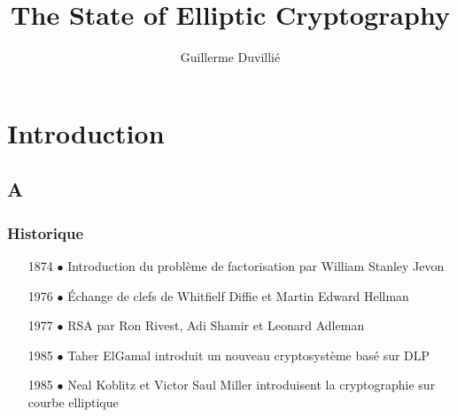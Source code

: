 \documentclass[9pt]{beamer}
\title[Elliptic Curve Cryptography]{The State of Elliptic Cryptography}
\author[G. Duvillié]{Guillerme Duvillié}
\institute{Université Montpellier 2}
\begin{document}
\begin{frame}
    \titlepage
\end{frame}

\addtocounter{framenumber}{-1}

\section{Introduction}

\subsection*{A}

\begin{frame}
    \frametitle{Historique}
    \vfill
    \begin{itemize}
        \item[1874 $\bullet$] Introduction du problème de factorisation par William Stanley
            Jevon
            \vfill
        \item[1976 $\bullet$] Échange de clefs de Whitfielf Diffie et Martin Edward Hellman
            \vfill
        \item[1977 $\bullet$] RSA par Ron Rivest, Adi Shamir et Leonard Adleman
            \vfill
        \item[1985 $\bullet$] Taher ElGamal introduit un nouveau cryptosystème basé sur DLP
            \vfill
        \item[1985 $\bullet$] Neal Koblitz et Victor Saul Miller introduisent la
            cryptographie sur courbe elliptique
            \vfill
    \end{itemize}
\end{frame}
\end{document}
